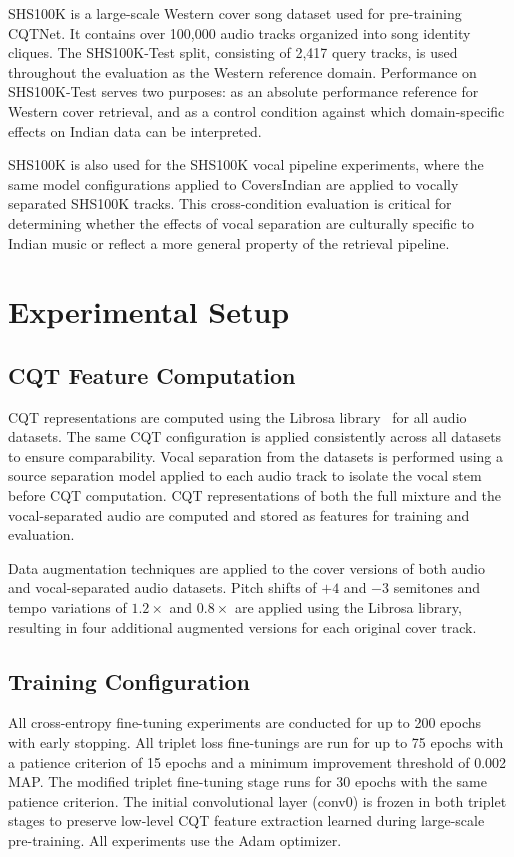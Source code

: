 \documentclass[conference]{IEEEtran}
\begin{document}
SHS100K is a large-scale Western cover song dataset used for pre-training CQTNet. It contains over 100,000 audio tracks organized into song identity cliques. The SHS100K-Test split, consisting of 2,417 query tracks, is used throughout the evaluation as the Western reference domain. Performance on SHS100K-Test serves two purposes: as an absolute performance reference for Western cover retrieval, and as a control condition against which domain-specific effects on Indian data can be interpreted.

SHS100K is also used for the SHS100K vocal pipeline experiments, where the same model configurations applied to CoversIndian are applied to vocally separated SHS100K tracks. This cross-condition evaluation is critical for determining whether the effects of vocal separation are culturally specific to Indian music or reflect a more general property of the retrieval pipeline.


\section{Experimental Setup}

\subsection{CQT Feature Computation}

CQT representations are computed using the Librosa library~\cite{ismir_paper} for all audio datasets. The same CQT configuration is applied consistently across all datasets to ensure comparability. Vocal separation from the datasets is performed using a source separation model applied to each audio track to isolate the vocal stem before CQT computation. CQT representations of both the full mixture and the vocal-separated audio are computed and stored as features for training and evaluation.

Data augmentation techniques are applied to the cover versions of both audio and vocal-separated audio datasets. Pitch shifts of $+4$ and $-3$ semitones and tempo variations of $1.2\times$ and $0.8\times$ are applied using the Librosa library, resulting in four additional augmented versions for each original cover track.

\subsection{Training Configuration}

All cross-entropy fine-tuning experiments are conducted for up to 200 epochs with early stopping. All triplet loss fine-tunings are run for up to 75 epochs with a patience criterion of 15 epochs and a minimum improvement threshold of 0.002 MAP. The modified triplet fine-tuning stage runs for 30 epochs with the same patience criterion. The initial convolutional layer (conv0) is frozen in both triplet stages to preserve low-level CQT feature extraction learned during large-scale pre-training. All experiments use the Adam optimizer.
\end{document}
